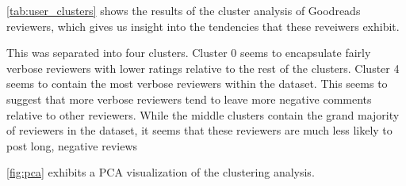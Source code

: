 \autoref{tab:user_clusters} shows the results of the cluster analysis of Goodreads reviewers, which gives us insight into the tendencies that these reveiwers exhibit.

This was separated into four clusters. Cluster 0 seems to encapsulate fairly verbose reviewers with lower ratings relative to the rest of the clusters. Cluster 4 seems to contain the most verbose reviewers within the dataset. This
seems to suggest that more verbose reviewers tend to leave more negative comments relative to other reviewers. While the middle clusters contain the grand majority of reviewers in the dataset, it seems that these reviewers are much less likely to post long, negative reviews

\autoref{fig:pca} exhibits a PCA visualization of the clustering analysis.